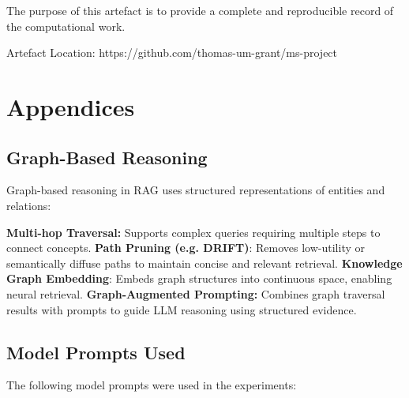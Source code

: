 \documentclass[12pt,twoside]{report}
\begin{document}
The purpose of this artefact is to provide a complete and reproducible record of the computational work.

Artefact Location: https://github.com/thomas-um-grant/ms-project


\newpage
\appendix

\chapter*{Appendices}

\section{Graph-Based Reasoning}
\label{appendix:graphBasedReasoning}
Graph-based reasoning in RAG uses structured representations of entities and relations:

\textbf{Multi-hop Traversal:} Supports complex queries requiring multiple steps to connect concepts.
\textbf{Path Pruning (e.g. DRIFT)}: Removes low-utility or semantically diffuse paths to maintain concise and relevant retrieval.
\textbf{Knowledge Graph Embedding}: Embeds graph structures into continuous space, enabling neural retrieval.
\textbf{Graph-Augmented Prompting:} Combines graph traversal results with prompts to guide LLM reasoning using structured evidence.

\section{Model Prompts Used}
\label{sec:model_prompts}
The following model prompts were used in the experiments:
\end{document}
